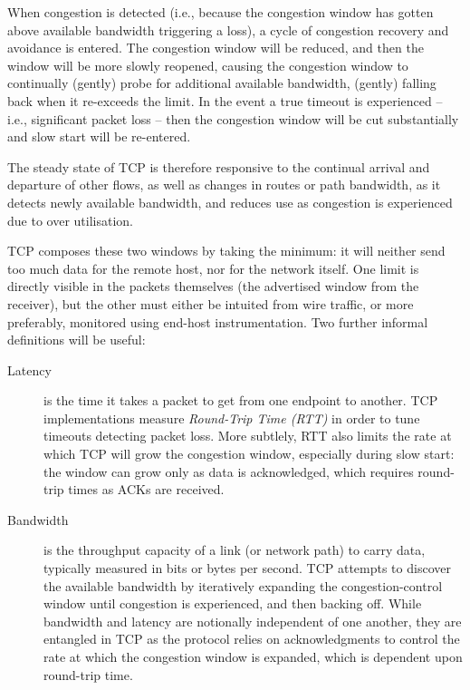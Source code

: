 \documentclass[a4paper,10pt]{article}
\begin{document}
\begin{description}
  When congestion is detected (i.e., because the congestion window has gotten
  above available bandwidth triggering a loss), a cycle of congestion recovery
  and avoidance is entered.
  The congestion window will be reduced, and then the window will be more
  slowly reopened, causing the congestion window to continually (gently) probe
  for additional available bandwidth, (gently) falling back when it re-exceeds
  the limit.
  In the event a true timeout is experienced -- i.e., significant packet loss
  -- then the congestion window will be cut substantially and slow start will
  be re-entered.

  The steady state of TCP is therefore responsive to the continual arrival and
  departure of other flows, as well as changes in routes or path bandwidth, as
  it detects newly available bandwidth, and reduces use as congestion is
  experienced due to over utilisation.
\end{description}

TCP composes these two windows by taking the minimum: it will neither send too
much data for the remote host, nor for the network itself.
One limit is directly visible in the packets themselves (the advertised
window from the receiver), but the other must either be intuited from wire
traffic, or more preferably, monitored using end-host instrumentation.
Two further informal definitions will be useful:

\begin{description}
\item[Latency] is the time it takes a packet to get from one endpoint to
  another.
  TCP implementations measure \textit{Round-Trip Time (RTT)} in order to tune
  timeouts detecting packet loss.
  More subtlely, RTT also limits the rate at which TCP will grow the
  congestion window, especially during slow start: the window can grow only as
  data is acknowledged, which requires round-trip times as ACKs are received.

\item[Bandwidth] is the throughput capacity of a link (or network path) to
  carry data, typically measured in bits or bytes per second.
  TCP attempts to discover the available bandwidth by iteratively expanding
  the congestion-control window until congestion is experienced, and then
  backing off.
  While bandwidth and latency are notionally independent of one another, they
  are entangled in TCP as the protocol relies on acknowledgments to control
  the rate at which the congestion window is expanded, which is dependent upon
  round-trip time.
\end{description}
\end{document}
